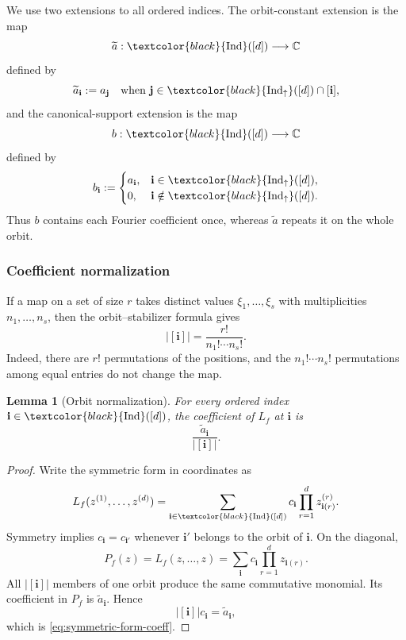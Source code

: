 \documentclass[11pt,a4paper]{article}
\numberwithin{equation}{section}
\theoremstyle{cleanplain}
\newtheorem{lemma}[lemma]{Lemma}
\theoremstyle{cleandefinition}
\theoremstyle{cleanremark}
\newcommand{\C}{\mathbb C}
\newcommand{\Ind}{\textcolor{black}{\operatorname{Ind}}}
\newcommand{\Indup}{\textcolor{black}{\operatorname{Ind}_{\uparrow}}}
\begin{document}
{We use two extensions to all ordered indices.  The orbit-constant extension is
the map
\[
 \widetilde a:\Ind([d])\longrightarrow\C
\]
defined by
\begin{equation}\label{eq:atilde-def}
 \widetilde a_{\mathbf i}:=a_{\mathbf j}
 \quad\text{when }\mathbf j\in\Indup([d])\cap[\mathbf i],
\end{equation}
and the canonical-support extension is the map
\[
 b:\Ind([d])\longrightarrow\C
\]
defined by
\begin{equation}\label{eq:b-def}
 b_{\mathbf i}:=
 \begin{cases}
  a_{\mathbf i},&\mathbf i\in\Indup([d]),\\
  0,&\mathbf i\notin\Indup([d]).
 \end{cases}
\end{equation}
Thus $b$ contains each Fourier coefficient once, whereas
$\widetilde a$ repeats it on the whole orbit.

\subsubsection{Coefficient normalization}

If a map on a set of size $r$ takes distinct values
$\xi_1,\ldots,\xi_s$ with multiplicities
$n_1,\ldots,n_s$, then the orbit--stabilizer formula gives
\begin{equation}\label{eq:general-orbit-size}
 |[\mathbf i]|=\frac{r!}{n_1!\cdots n_s!}.
\end{equation}
Indeed, there are $r!$ permutations of the positions, and the
$n_1!\cdots n_s!$ permutations among equal entries do not change the map.

\begin{lemma}[Orbit normalization]\label{lem:symmetric-coeff}
For every ordered index $\mathbf i\in\Ind([d])$, the coefficient of
$L_f$ at $\mathbf i$ is
\begin{equation}\label{eq:symmetric-form-coeff}
 \frac{\widetilde a_{\mathbf i}}{|[\mathbf i]|}.
\end{equation}
\end{lemma}

\begin{proof}
Write the symmetric form in coordinates as
\[
 L_f(z^{(1)},\ldots,z^{(d)})
 =\sum_{\mathbf i\in\Ind([d])}
 c_{\mathbf i}\prod_{r=1}^d z^{(r)}_{\mathbf i(r)}.
\]
Symmetry implies $c_{\mathbf i}=c_{\mathbf i'}$ whenever
$\mathbf i'$ belongs to the orbit of $\mathbf i$.  On the diagonal,
\[
 P_f(z)=L_f(z,\ldots,z)
 =\sum_{\mathbf i}c_{\mathbf i}
   \prod_{r=1}^d z_{\mathbf i(r)}.
\]
All $|[\mathbf i]|$ members of one orbit produce the same commutative
monomial.  Its coefficient in $P_f$ is $\widetilde a_{\mathbf i}$.  Hence
\[
 |[\mathbf i]|c_{\mathbf i}=\widetilde a_{\mathbf i},
\]
which is \eqref{eq:symmetric-form-coeff}.
\end{proof}

}
\end{document}
